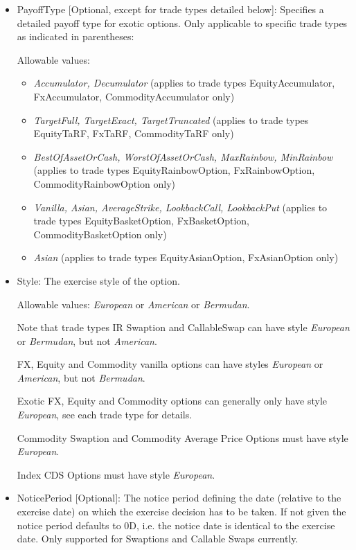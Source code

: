 \begin{itemize}
\begin{table}[H]
\begin{tabu}
  \end{tabu}
  \caption{Specification of Option Type Call / Put}
  \label{tab:callput_specs}
\end{table}

\item PayoffType [Optional, except for trade types detailed below]: Specifies a detailed payoff type for exotic options. Only applicable to specific trade types as
  indicated in parentheses:

  Allowable values:
  \begin{itemize}
  \item \emph{Accumulator, Decumulator} (applies to trade types EquityAccumulator, FxAccumulator, CommodityAccumulator only)
  \item \emph{TargetFull, TargetExact, TargetTruncated} (applies to trade types EquityTaRF, FxTaRF, CommodityTaRF only)
  \item \emph{BestOfAssetOrCash, WorstOfAssetOrCash, MaxRainbow, MinRainbow} (applies to trade types EquityRainbowOption,
    FxRainbowOption, CommodityRainbowOption only)
  \item \emph{Vanilla, Asian, AverageStrike, LookbackCall, LookbackPut} (applies to trade types EquityBasketOption,
    FxBasketOption, CommodityBasketOption only)
  \item \emph{Asian} (applies to trade types EquityAsianOption, FxAsianOption only)    
  \end{itemize}

\item Style: The exercise style of the option. 

  Allowable values: \emph{European} or \emph{American} or \emph{Bermudan}. 
  
  Note that trade types IR Swaption and CallableSwap can have style
  \emph{European} or \emph{Bermudan}, but not \emph{American}.  
  
  FX, Equity and Commodity vanilla options can have styles \emph{European}
  or \emph{American}, but not \emph{Bermudan}. 
  
  Exotic FX, Equity and Commodity  options can generally only have style \emph{European}, see each trade type for details.
  
  Commodity Swaption and Commodity Average Price Options must have style \emph{European}. 
  
  Index CDS Options must have style  \emph{European}. 

\item NoticePeriod [Optional]: The notice period defining the date (relative to the exercise date) on which the exercise
  decision has to be taken. If not given the notice period defaults to 0D, i.e. the notice date is identical to the
  exercise date. Only supported for Swaptions and Callable Swaps currently.


\end{itemize}
